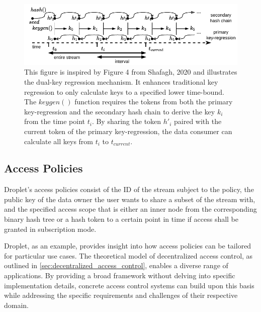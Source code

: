 \documentclass[conference]{IEEEtran}
\begin{document}
\begin{figure}[htbp]
  \centering
  \includegraphics[width=\linewidth]{figures/dual_key_regression.pdf}
  \caption{
    This figure is inspired by Figure 4 from Shafagh, 2020 \cite{shafagh_droplet_2020} and illustrates the dual-key regression mechanism.
    It enhances traditional key regression to only calculate keys to a specified lower time-bound.
    The $keygen()$ function requires the tokens from both the primary key-regression and the secondary hash chain to derive the key $k_i$ from the time point $t_i$.
    By sharing the token $h'_i$ paired with the current token of the primary key-regression, the data consumer can calculate all keys from $t_i$ to $t_{current}$. 
  }
  \label{fig:dual_key_regression}
\end{figure}

\subsection{Access Policies}
Droplet's access policies consist of the ID of the stream subject to the policy, the public key of the data owner the user wants to share a subset of the stream with, and the specified access scope that is either an inner node from the corresponding binary hash tree or a hash token to a certain point in time if access shall be granted in subscription mode.

Droplet, as an example, provides insight into how access policies can be tailored for particular use cases.
The theoretical model of decentralized access control, as outlined in \autoref{sec:decentralized_access_control}, enables a diverse range of applications.
By providing a broad framework without delving into specific implementation details, concrete access control systems can build upon this basis while addressing the specific requirements and challenges of their respective domain.
\end{document}
